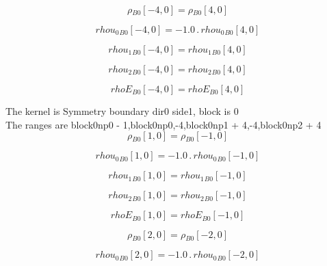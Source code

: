\documentclass{article}
\begin{document}
\begin{dmath}{\rho{_{B0}}}[{-4,0}] = {\rho{_{B0}}}[{4,0}]\end{dmath}

\begin{dmath}{rhou_{0}{_{B0}}}[{-4,0}] = - 1.0 \,.\, {rhou_{0}{_{B0}}}[{4,0}]\end{dmath}

\begin{dmath}{rhou_{1}{_{B0}}}[{-4,0}] = {rhou_{1}{_{B0}}}[{4,0}]\end{dmath}

\begin{dmath}{rhou_{2}{_{B0}}}[{-4,0}] = {rhou_{2}{_{B0}}}[{4,0}]\end{dmath}

\begin{dmath}{rhoE{_{B0}}}[{-4,0}] = {rhoE{_{B0}}}[{4,0}]\end{dmath}

\noindent The kernel is Symmetry boundary dir0 side1, block is 0\\\noindent The ranges are block0np0 - 1,block0np0,-4,block0np1 + 4,-4,block0np2 + 4\\\begin{dmath}{\rho{_{B0}}}[{1,0}] = {\rho{_{B0}}}[{-1,0}]\end{dmath}

\begin{dmath}{rhou_{0}{_{B0}}}[{1,0}] = - 1.0 \,.\, {rhou_{0}{_{B0}}}[{-1,0}]\end{dmath}

\begin{dmath}{rhou_{1}{_{B0}}}[{1,0}] = {rhou_{1}{_{B0}}}[{-1,0}]\end{dmath}

\begin{dmath}{rhou_{2}{_{B0}}}[{1,0}] = {rhou_{2}{_{B0}}}[{-1,0}]\end{dmath}

\begin{dmath}{rhoE{_{B0}}}[{1,0}] = {rhoE{_{B0}}}[{-1,0}]\end{dmath}

\begin{dmath}{\rho{_{B0}}}[{2,0}] = {\rho{_{B0}}}[{-2,0}]\end{dmath}

\begin{dmath}{rhou_{0}{_{B0}}}[{2,0}] = - 1.0 \,.\, {rhou_{0}{_{B0}}}[{-2,0}]\end{dmath}
\end{document}
